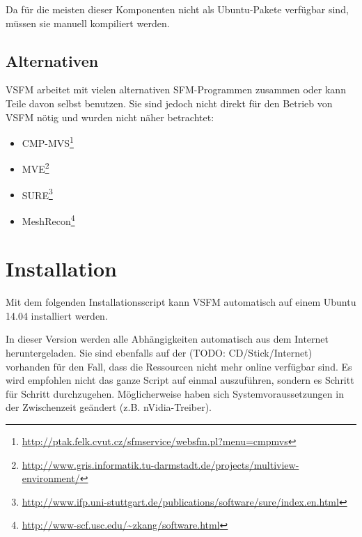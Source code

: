 \noindent Da für die meisten dieser Komponenten nicht als Ubuntu-Pakete
verfügbar sind, müssen sie manuell kompiliert werden.

\subsection{Alternativen}

VSFM arbeitet mit vielen alternativen SFM-Programmen zusammen oder kann Teile davon selbst
benutzen. Sie sind jedoch nicht direkt für den Betrieb von VSFM nötig und wurden
nicht näher betrachtet:

\begin{itemize}
	\item CMP-MVS\footnote{\url{http://ptak.felk.cvut.cz/sfmservice/websfm.pl?menu=cmpmvs}}
	\item MVE\footnote{\url{http://www.gris.informatik.tu-darmstadt.de/projects/multiview-environment/}}
	\item SURE\footnote{\url{http://www.ifp.uni-stuttgart.de/publications/software/sure/index.en.html}}
	\item MeshRecon\footnote{\url{http://www-scf.usc.edu/~zkang/software.html}}
\end{itemize}


\section{Installation}

Mit dem folgenden Installationsscript kann VSFM automatisch auf einem Ubuntu 14.04
installiert werden.

In dieser Version werden alle Abhängigkeiten automatisch aus dem
Internet heruntergeladen. Sie sind ebenfalls auf der (TODO: CD/Stick/Internet) vorhanden 
für den Fall, dass die Ressourcen nicht mehr online verfügbar sind. Es wird empfohlen
nicht das ganze Script auf einmal auszuführen, sondern es Schritt für Schritt durchzugehen.
Möglicherweise haben sich Systemvoraussetzungen in der Zwischenzeit geändert
(z.B. nVidia-Treiber).

